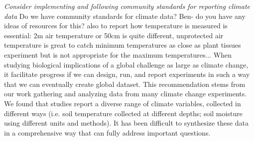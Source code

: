 \documentclass{article}
\begin{document}
\par\textit{Consider implementing and following community standards for reporting climate data} Do we have community standards for climate data? Ben- do you have any ideas of resources for this? also to report how temperature is measured is essential: 2m air temperature or 50cm is quite different, unprotected air temperature is great to catch minimum temperatures as close as plant tissues experiment but is not appropriate for the maximum temperatures...
When studying biological implications of a global challenge as large as climate change, it facilitate progress if we can design, run, and report experiments in such a way that we can eventually create global dataset. This recommendation stems from our work gathering and analyzing data from many climate change experiments. We found that studies report a diverse range of climate variables, collected in different ways (i.e. soil temperature collected at different depths; soil moisture using different units and methods). It has been difficult to synthesize these data in a comprehensive way that can fully address important questions. 
\end{document}

